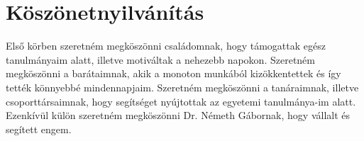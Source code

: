 \chapter*{Köszönetnyilvánítás}
Első körben szeretném megköszönni családomnak, hogy támogattak egész tanulmányaim alatt, illetve motiváltak a nehezebb napokon. Szeretném megköszönni a barátaimnak, akik a monoton munkából kizökkentettek és így tették könnyebbé mindennapjaim. Szeretném megköszönni a tanáraimnak, illetve csoporttársaimnak, hogy segítséget nyújtottak az egyetemi tanulmánya-im alatt.
Ezenkívül külön szeretném megköszönni Dr. Németh Gábornak, hogy vállalt és segített engem.

\newpage